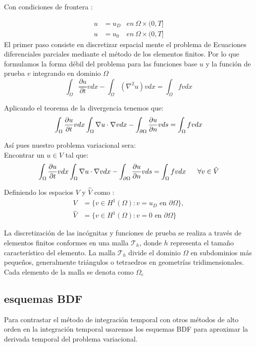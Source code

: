 \documentclass[12pt]{article}
\begin{document}
Con condiciones de frontera :

\begin{align}
	u &= u_D &en \ \Omega \times( 0,T]   \\
	u&=u_0 &en \ \Omega \times (0,T] 
\end{align}
El primer paso consiste en discretizar espacial mente el problema de Ecuaciones diferenciales parciales mediante el método de los elementos finitos. Por lo que formulamos la forma débil del problema para las funciones base $u$ y la función de prueba $v$ integrando en dominio $\Omega$ 
\begin{equation}
	\int_\Omega \frac{\partial u}{\partial t}v dx  -\int_\Omega (\nabla^2 u)v dx = \int_\Omega fv dx 
\end{equation}

Aplicando el teorema de la divergencia tenemos que: 
\begin{equation}
	\int_\Omega \frac{\partial u}{\partial t}v dx  \int_\Omega\nabla u\cdot\nabla v dx - \int_{\partial\Omega}{\partial u\over
		\partial n}v ds = \int_\Omega fv dx 
\end{equation}

Así pues nuestro problema variacional sera: \\

Encontrar un $u \in V$ tal que:  
\begin{equation}
	\int_\Omega \frac{\partial u}{\partial t}v dx  \int_\Omega\nabla u\cdot\nabla v dx - \int_{\partial\Omega}{\partial u\over
		\partial n}v ds = \int_\Omega fv dx  \ \ \ \ \  \forall v \in \hat{V}
\end{equation}

Definiendo los espacios $V$ y $\hat{V}$ como : 
\begin{align}
	V      &= \{v \in H^1(\Omega) : v =u_D  \mbox{ en } \partial\Omega\}, \\ 
	\hat{V} &= \{v \in H^1(\Omega) : v = 0 \mbox{ en } \partial\Omega\}
\end{align}

La discretización de las incógnitas y funciones de prueba se realiza a través de elementos finitos conformes en una malla $\mathcal{T}_h$, donde $h$ representa el tamaño característico del elemento. La malla $\mathcal{T}_h$ divide el dominio $\Omega$ en subdominios más pequeños, generalmente triángulos o tetraedros en geometrías tridimensionales. Cada elemento de la malla se denota como $\Omega_e$


\subsection{esquemas BDF }
Para contrastar el método de integración temporal con otros métodos de alto orden en la integración temporal usaremos los esquemas BDF para aproximar la derivada temporal del problema variacional.\\
 
\end{document}
